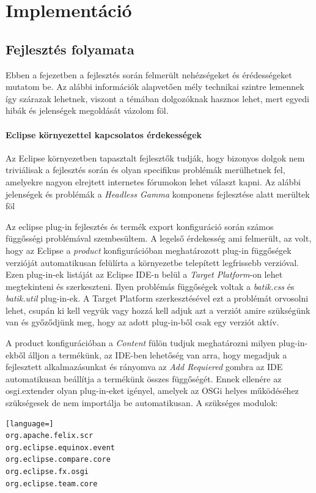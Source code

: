 \section{Implementáció}

\subsection{Fejlesztés folyamata}


Ebben a fejezetben a fejlesztés során felmerült nehézségeket és érédességeket mutatom be. Az alábbi információk alapvetően mély technikai szintre lemennek így szárazak lehetnek, viszont a témában dolgozóknak hasznos lehet, mert egyedi hibák és jelenségek megoldását vázolom föl.

\paragraph{Eclipse környezettel kapcsolatos érdekességek} Az Eclipse környezetben tapasztalt fejlesztők tudják, hogy bizonyos dolgok nem triviálisak a fejlesztés során és olyan specifikus problémák merülhetnek fel, amelyekre nagyon elrejtett internetes fórumokon lehet választ kapni. Az alábbi jelenségek és problémák a \textit{Headless Gamma} komponens fejlesztése alatt merültek föl

Az eclipse plug-in fejlesztés és termék export konfiguráció során számos függősségi problémával szembesültem. A legelső érdekesség ami felmerült, az volt, hogy az Eclipse a \textit{product} konfigurációban meghatározott plug-in függőségek verzióját automatikusan felülírta a környezetbe telepített legfrissebb verzióval. Ezen plug-in-ek listáját az Eclipse IDE-n belül a \textit{Target Platform}-on lehet megtekinteni és szerkeszteni. Ilyen problémás függőségek voltak a \textit{batik.css} és \textit{batik.util} plug-in-ek. A Target Platform szerkesztésével ezt a problémát orvosolni lehet, csupán ki kell vegyük vagy hozzá kell adjuk azt a verziót amire szükségünk van és győződjünk meg, hogy az adott plug-in-ből csak egy verziót aktív.

A product konfigurációban a \textit{Content} fülön tudjuk meghatározni milyen plug-in-ekből álljon a termékünk, az IDE-ben lehetőség van arra, hogy megadjuk a fejlesztett alkalmazásunkat és rányomva az \textit{Add Requiered} gombra az IDE automatikusan beállítja a termékünk összes függőségét. Ennek ellenére az osgi.extender olyan plug-in-eket igényel, amelyek az OSGi helyes működéséhez szükségesek de nem importálja be automatikusan. A szükséges modulok:
\begin{lstlisting}[language=]
org.apache.felix.scr
org.eclipse.equinox.event
org.eclipse.compare.core
org.eclipse.fx.osgi
org.eclipse.team.core
\end{lstlisting}

